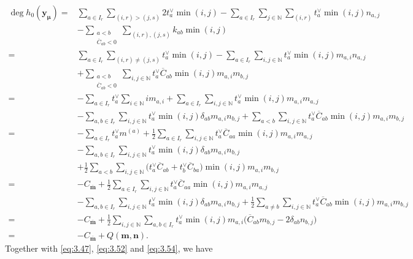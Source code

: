 \documentclass[10pt,a4paper]{amsart}
\numberwithin{equation}{section}
\begin{document}
\begin{align*}
\deg h_0(\mathbf{y}_{\bm{\mu}})
={}&\sum_{a\in I_r}\sum_{(i,r)>(j,s)}2t_a^{\vee}\min(i,j)-\sum_{a\in I_r}\sum_{j\in\mathbb{N}}\sum_{(i,r)} t_a^{\vee}\min(i,j)n_{a,j}\\
&-\sum_{\substack{a<b\\ \overline{C}_{ab}<0}}\sum_{(i,r),(j,s)}k_{ab}\min(i,j)\\
={}&\sum_{a\in I_r}\sum_{(i,r)\neq(j,s)}t_a^{\vee}\min(i,j)-\sum_{a\in I_r}\sum_{i,j\in\mathbb{N}} t_a^{\vee}\min(i,j) m_{a,i}n_{a,j}\\
&+\sum_{\substack{a<b\\ \overline{C}_{ab}<0}}\sum_{i,j\in\mathbb{N}}t_a^{\vee}\overline{C}_{ab}\min(i,j)m_{a,i}m_{b,j}\\
={}&-\sum_{a\in I_r}t_a^{\vee}\sum_{i\in\mathbb{N}}im_{a,i}+\sum_{a\in I_r}\sum_{i,j\in\mathbb{N}}t_a^{\vee}\min(i,j)m_{a,i}m_{a,j}\\
&-\sum_{a,b\in I_r}\sum_{i,j\in\mathbb{N}} t_a^{\vee}\min(i,j)\delta_{ab}m_{a,i}n_{b,j}+\sum_{a<b}\sum_{i,j\in\mathbb{N}}t_a^{\vee}\overline{C}_{ab}\min(i,j)m_{a,i}m_{b,j}\\
={}&-\sum_{a\in I_r}t_a^{\vee}m^{(a)}+\frac{1}{2}\sum_{a\in I_r}\sum_{i,j\in\mathbb{N}}t_a^{\vee}\overline{C}_{aa}\min(i,j) m_{a,i}m_{a,j}\\
&-\sum_{a,b\in I_r}\sum_{i,j\in\mathbb{N}} t_a^{\vee}\min(i,j)\delta_{ab}m_{a,i}n_{b,j}\\
&+\frac{1}{2}\sum_{a<b}\sum_{i,j\in\mathbb{N}}\bigl(t_a^{\vee}\overline{C}_{ab}+t_b^{\vee}\overline{C}_{ba}\bigr)\min(i,j)m_{a,i}m_{b,j}\\
={}&-C_{\overline{\mathbf{m}}}+\frac{1}{2}\sum_{a\in I_r}\sum_{i,j\in\mathbb{N}}t_a^{\vee}\overline{C}_{aa}\min(i,j) m_{a,i}m_{a,j}\\
&-\sum_{a,b\in I_r}\sum_{i,j\in\mathbb{N}} t_a^{\vee}\min(i,j)\delta_{ab}m_{a,i}n_{b,j}+\frac{1}{2}\sum_{a\neq b}\sum_{i,j\in\mathbb{N}}t_a^{\vee}\overline{C}_{ab}\min(i,j)m_{a,i}m_{b,j}\\
={}&-C_{\overline{\mathbf{m}}}+\frac{1}{2}\sum_{i,j\in\mathbb{N}} \sum_{a,b\in I_r}t_a^{\vee}\min(i,j)m_{a,i}\bigl( \overline{C}_{ab}m_{b,j}-2\delta_{ab}n_{b,j}\bigr)\\
={}&-C_{\overline{\mathbf{m}}}+Q(\mathbf{m},\mathbf{n}).
\end{align*}
Together with \eqref{eq:3.47}, \eqref{eq:3.52} and \eqref{eq:3.54}, we have
\end{document}
